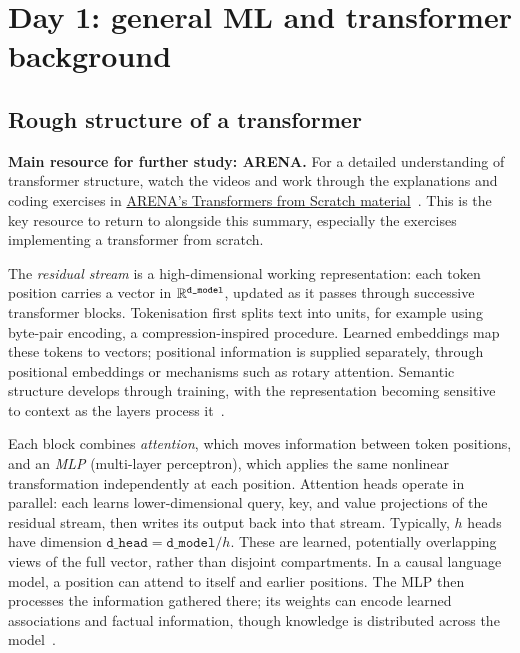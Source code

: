 

\section{Day 1: general ML and transformer background}

\subsection{Rough structure of a transformer}

\noindent\textbf{Main resource for further study: ARENA.} For a detailed understanding of transformer structure, watch the videos and work through the explanations and coding exercises in \href{https://learn.arena.education/chapter1_transformer_interp/01_transformers/intro/}{ARENA's Transformers from Scratch material}~\cite{arenaTransformers}. This is the key resource to return to alongside this summary, especially the exercises implementing a transformer from scratch.

The \emph{residual stream} is a high-dimensional working representation: each token position carries a vector in $\mathbb{R}^{\texttt{d\_model}}$, updated as it passes through successive transformer blocks. Tokenisation first splits text into units, for example using byte-pair encoding, a compression-inspired procedure. Learned embeddings map these tokens to vectors; positional information is supplied separately, through positional embeddings or mechanisms such as rotary attention. Semantic structure develops through training, with the representation becoming sensitive to context as the layers process it~\cite{wilhelmSchulz2026transformers}.

Each block combines \emph{attention}, which moves information between token positions, and an \emph{MLP} (multi-layer perceptron), which applies the same nonlinear transformation independently at each position. Attention heads operate in parallel: each learns lower-dimensional query, key, and value projections of the residual stream, then writes its output back into that stream. Typically, $h$ heads have dimension $\texttt{d\_head}=\texttt{d\_model}/h$. These are learned, potentially overlapping views of the full vector, rather than disjoint compartments. In a causal language model, a position can attend to itself and earlier positions. The MLP then processes the information gathered there; its weights can encode learned associations and factual information, though knowledge is distributed across the model~\cite{wilhelmSchulz2026transformers,vaswani2017attention}.

